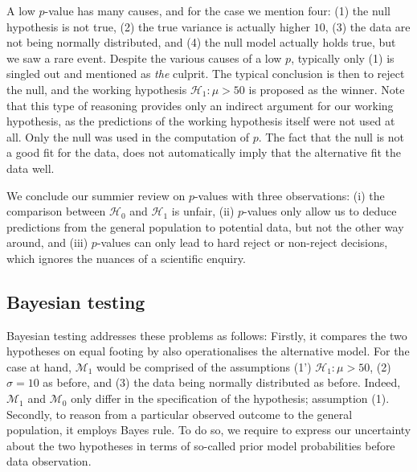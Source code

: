 \documentclass[english,,doc,floatsintext]{apa6}
\begin{document}
A low \(p\)-value has many causes, and for the case we mention four: (1) the null hypothesis is not true, (2) the true variance is actually higher \(10\), (3) the data are not being normally distributed, and (4) the null model actually holds true, but we saw a rare event. Despite the various causes of a low \(p\), typically only (1) is singled out and mentioned as \emph{the} culprit. The typical conclusion is then to reject the null, and the working hypothesis \(\mathcal{H}_{1} : \mu > 50\) is proposed as the winner. Note that this type of reasoning provides only an indirect argument for our working hypothesis, as the predictions of the working hypothesis itself were not used at all. Only the null was used in the computation of \(p\). The fact that the null is not a good fit for the data, does not automatically imply that the alternative fit the data well.

We conclude our summier review on \(p\)-values with three observations: (i) the comparison between \(\mathcal{H}_{0}\) and \(\mathcal{H}_{1}\) is unfair, (ii) \(p\)-values only allow us to deduce predictions from the general population to potential data, but not the other way around, and (iii) \(p\)-values can only lead to hard reject or non-reject decisions, which ignores the nuances of a scientific enquiry.

\subsection{Bayesian testing}

Bayesian testing addresses these problems as follows: Firstly, it compares the two hypotheses on equal footing by also operationalises the alternative model. For the case at hand, \(\mathcal{M}_{1}\) would be comprised of the assumptions (1') \(\mathcal{H}_{1}: \mu > 50\), (2) \(\sigma =10\) as before, and (3) the data being normally distributed as before. Indeed, \(\mathcal{M}_{1}\) and \(\mathcal{M}_{0}\) only differ in the specification of the hypothesis; assumption (1). Secondly, to reason from a particular observed outcome to the general population, it employs Bayes rule. To do so, we require to express our uncertainty about the two hypotheses in terms of so-called prior model probabilities before data observation.
\end{document}
